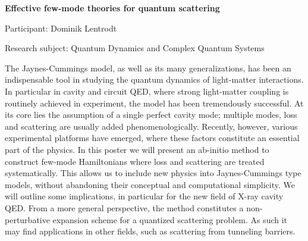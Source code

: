 \begin{minipage}[t]{1.0\textwidth}

\begin{center}

{{\large\bfseries Effective few-mode theories for quantum scattering}\par}

\end{center}

{\noindent Participant: Dominik Lentrodt\par} 

{\noindent Research subject: Quantum Dynamics and Complex Quantum Systems\par}\medskip

\noindent The Jaynes-Cummings model, as well as its many generalizations, has been an indispensable tool in studying the quantum dynamics of light-matter interactions. In particular in cavity and circuit QED, where strong light-matter coupling is routinely achieved in experiment, the model has been tremendously successful. At its core lies the assumption of a single perfect cavity mode; multiple modes, loss and scattering are usually added phenomenologically.
Recently, however, various experimental platforms have emerged, where these factors constitute an essential part of the physics. In this poster we will present an ab-initio method to construct few-mode Hamiltonians where loss and scattering are treated systematically. This allows us to include new physics into Jaynes-Cummings type models, without abandoning their conceptual and computational simplicity. We will outline some implications, in particular for the new field of X-ray cavity QED.
From a more general perspective, the method constitutes a non-perturbative expansion scheme for a quantized scattering problem. As such it may find applications in other fields, such as scattering from tunneling barriers.\par\end{minipage}

\hfill 

